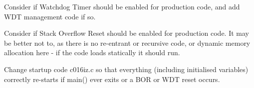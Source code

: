 
\begin{DoxyRefList}
\item[\label{todo__todo000001}%
\hypertarget{todo__todo000001}{}%
File \hyperlink{_config_regs18f4520_8h}{Config\+Regs18f4520.h} ]Consider if Watchdog Timer should be enabled for production code, and add W\+D\+T management code if so.

Consider if Stack Overflow Reset should be enabled for production code. It may be better not to, as there is no re-\/entrant or recursive code, or dynamic memory allocation here -\/ if the code loads statically it should run.

Change startup code c016iz.\+c so that everything (including initialised variables) correctly re-\/starts if main() ever exits or a B\+O\+R or W\+D\+T reset occurs. 
\end{DoxyRefList}